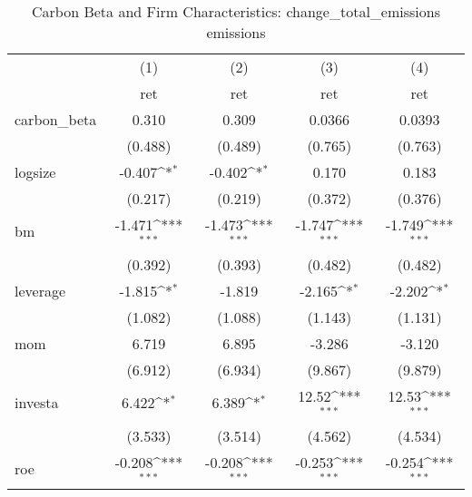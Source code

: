 \begin{table}[htbp]\centering
\def\sym#1{\ifmmode^{#1}\else\(^{#1}\)\fi}
\caption{Carbon Beta and Firm Characteristics: change\_total\_emissions emissions}
\begin{tabular}{l*{4}{c}}
\hline\hline
                    &\multicolumn{1}{c}{(1)}&\multicolumn{1}{c}{(2)}&\multicolumn{1}{c}{(3)}&\multicolumn{1}{c}{(4)}\\
                    &\multicolumn{1}{c}{ret}&\multicolumn{1}{c}{ret}&\multicolumn{1}{c}{ret}&\multicolumn{1}{c}{ret}\\
\hline
carbon\_beta         &       0.310         &       0.309         &      0.0366         &      0.0393         \\
                    &     (0.488)         &     (0.489)         &     (0.765)         &     (0.763)         \\
[1em]
logsize             &      -0.407\sym{*}  &      -0.402\sym{*}  &       0.170         &       0.183         \\
                    &     (0.217)         &     (0.219)         &     (0.372)         &     (0.376)         \\
[1em]
bm                  &      -1.471\sym{***}&      -1.473\sym{***}&      -1.747\sym{***}&      -1.749\sym{***}\\
                    &     (0.392)         &     (0.393)         &     (0.482)         &     (0.482)         \\
[1em]
leverage            &      -1.815\sym{*}  &      -1.819         &      -2.165\sym{*}  &      -2.202\sym{*}  \\
                    &     (1.082)         &     (1.088)         &     (1.143)         &     (1.131)         \\
[1em]
mom                 &       6.719         &       6.895         &      -3.286         &      -3.120         \\
                    &     (6.912)         &     (6.934)         &     (9.867)         &     (9.879)         \\
[1em]
investa             &       6.422\sym{*}  &       6.389\sym{*}  &       12.52\sym{***}&       12.53\sym{***}\\
                    &     (3.533)         &     (3.514)         &     (4.562)         &     (4.534)         \\
[1em]
roe                 &      -0.208\sym{***}&      -0.208\sym{***}&      -0.253\sym{***}&      -0.254\sym{***}\\

\end{tabular}
\end{table}
